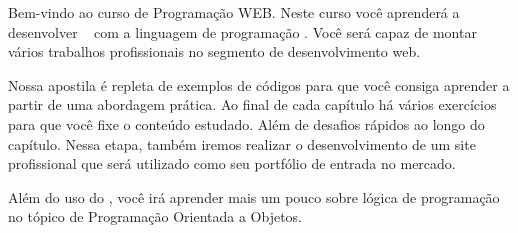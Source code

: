 \setlength{\absparsep}{18pt} %
\begin{resumo}
Bem-vindo ao curso de Programação WEB. Neste curso você aprenderá a desenvolver \site~
com a linguagem de programação \php. Você será capaz de montar vários trabalhos
profissionais no segmento de desenvolvimento web.

Nossa apostila é repleta de exemplos de códigos para que você consiga aprender a partir de uma
abordagem prática. Ao final de cada capítulo há vários exercícios para que você fixe o conteúdo estudado. 
Além de desafios rápidos ao longo do capítulo. Nessa etapa, também iremos realizar
o desenvolvimento de um site profissional que será utilizado como seu portfólio de entrada
no mercado.

Além do uso do \php, você irá aprender mais um pouco sobre lógica de programação no tópico
de Programação Orientada a Objetos.

\end{resumo}